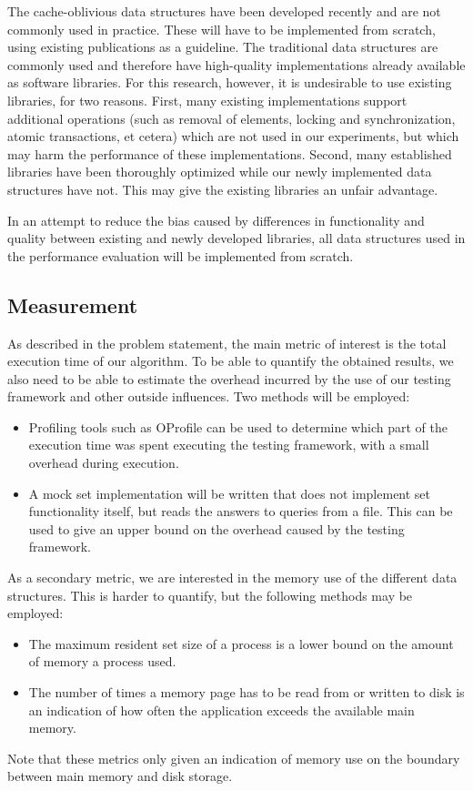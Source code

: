 \documentclass{acm_proc_article-sp}
\begin{document}
The cache-oblivious data structures have been developed recently and are not commonly used in practice. These will have to be implemented from scratch, using existing publications as a guideline. The traditional data structures are commonly used and therefore have high-quality implementations already available as software libraries. For this research, however, it is undesirable to use existing libraries, for two reasons. First, many existing implementations support additional operations (such as removal of elements, locking and synchronization, atomic transactions, et cetera) which are not used in our experiments, but which may harm the performance of these implementations. Second, many established libraries have been thoroughly optimized while our newly implemented data structures have not. This may give the existing libraries an unfair advantage.

In an attempt to reduce the bias caused by differences in functionality and quality between existing and newly developed libraries, all data structures used in the performance evaluation will be implemented from scratch.

\subsection{Measurement}
As described in the problem statement, the main metric of interest is the total execution time of our algorithm. To be able to quantify the obtained results, we also need to be able to estimate the overhead incurred by the use of our testing framework and other outside influences. Two methods will be employed:
\begin{itemize}
\item Profiling tools such as OProfile \cite{oprofile} can be used to determine which part of the execution time was spent executing the testing framework, with a small overhead during execution.
\item A mock set implementation will be written that does not implement set functionality itself, but reads the answers to queries from a file. This can be used to give an upper bound on the overhead caused by the testing framework.
\end{itemize}

As a secondary metric, we are interested in the memory use of the different data structures. This is harder to quantify, but the following methods may be employed:
\begin{itemize}
\item The maximum resident set size of a process is a lower bound on the amount of memory a process used.
\item The number of times a memory page has to be read from or written to disk is an indication of how often the application exceeds the available main memory.
\end{itemize}
Note that these metrics only given an indication of memory use on the boundary between main memory and disk storage.
\end{document}

